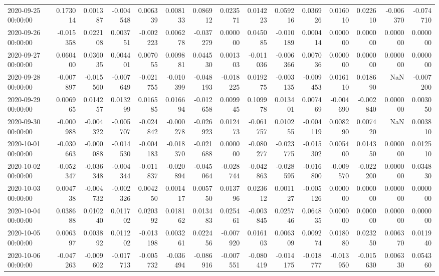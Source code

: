 \begin{tabular}{lrrrrrrrrrrrrrr}
2020-09-25 00:00:00 & 0.173014 & 0.001387 & -0.004548 & 0.006339 & 0.008133 & 0.086912 & 0.023571 & 0.014223 & 0.059216 & 0.036926 & 0.016010 & 0.022610 & -0.006370 & -0.074710 \\
2020-09-26 00:00:00 & -0.015358 & 0.022108 & 0.003751 & -0.002223 & 0.006278 & -0.037279 & 0.000000 & 0.045085 & -0.010189 & 0.000414 & 0.000000 & 0.000000 & 0.000000 & 0.000000 \\
2020-09-27 00:00:00 & 0.060400 & 0.036035 & 0.004401 & 0.007055 & 0.009881 & 0.044530 & 0.001303 & -0.011036 & -0.006366 & 0.007036 & 0.000000 & 0.000000 & 0.000000 & 0.000000 \\
2020-09-28 00:00:00 & -0.007897 & -0.015560 & -0.007649 & -0.021755 & -0.010399 & -0.048193 & -0.018225 & 0.019275 & -0.003135 & -0.009453 & 0.016110 & 0.018690 & NaN & -0.007200 \\
2020-09-29 00:00:00 & 0.006965 & 0.014257 & 0.013299 & 0.016585 & 0.016694 & -0.012658 & 0.009945 & 0.109978 & 0.013401 & 0.007469 & -0.004690 & -0.002840 & 0.000000 & 0.003050 \\
2020-09-30 00:00:00 & -0.000988 & -0.004322 & -0.005707 & -0.024842 & -0.000278 & -0.026923 & 0.012473 & -0.061757 & 0.010255 & -0.004119 & 0.008290 & 0.007420 & NaN & 0.003810 \\
2020-10-01 00:00:00 & -0.030663 & -0.000088 & -0.014530 & -0.004183 & -0.018370 & -0.021688 & 0.000000 & -0.080277 & -0.023775 & -0.015302 & 0.005400 & 0.014350 & 0.000000 & 0.012510 \\
2020-10-02 00:00:00 & -0.052347 & -0.036348 & -0.004344 & -0.011837 & -0.020894 & -0.045064 & -0.028744 & -0.042863 & -0.028595 & -0.016800 & -0.009570 & -0.022200 & 0.000000 & 0.034830 \\
2020-10-03 00:00:00 & 0.004738 & -0.004732 & -0.002326 & 0.004250 & 0.001417 & 0.005750 & 0.013796 & 0.023612 & 0.001127 & -0.005126 & 0.000000 & 0.000000 & 0.000000 & 0.000000 \\
2020-10-04 00:00:00 & 0.038688 & 0.010240 & 0.011702 & 0.020392 & 0.018162 & 0.013483 & 0.025461 & -0.003845 & 0.025746 & 0.064835 & 0.000000 & 0.000000 & 0.000000 & 0.000000 \\
2020-10-05 00:00:00 & 0.006397 & 0.003892 & 0.011202 & -0.013198 & 0.003261 & 0.022456 & -0.007920 & 0.016103 & 0.006309 & 0.009274 & 0.018080 & 0.023250 & 0.006370 & 0.011940 \\
2020-10-06 00:00:00 & -0.047263 & -0.009602 & -0.017713 & -0.005732 & -0.036494 & -0.086916 & -0.007551 & -0.080419 & -0.014175 & -0.018777 & -0.013950 & -0.015630 & 0.006330 & 0.054360 \\

\end{tabular}
